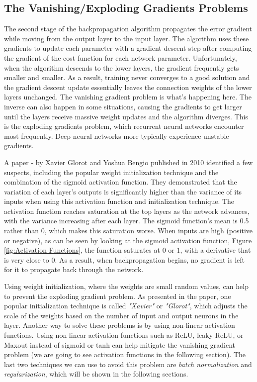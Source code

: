 \subsection{The Vanishing/Exploding Gradients Problems}
The second stage of the backpropagation algorithm propagates the error gradient while moving from the output layer to the input layer. The algorithm uses these gradients to update each parameter with a gradient descent step after computing the gradient of the cost function for each network parameter. 
Unfortunately, when the algorithm descends to the lower layers, the gradient frequently gets smaller and smaller. As a result, training never converges to a good solution and the gradient descent update essentially leaves the connection weights of the lower layers unchanged. The vanishing gradient problem is what's happening here.
The inverse can also happen in some situations, causing the gradients to get larger until the layers receive massive weight updates and the algorithm diverges. This is the exploding gradients problem, which recurrent neural networks encounter most frequently. Deep neural networks more typically experience unstable gradients.

A paper - by Xavier Glorot and Yoshua Bengio published in 2010 identified a few suspects, including the popular weight initialization technique and the combination of the sigmoid activation function. They demonstrated that the variation of each layer's outputs is significantly higher than the variance of its inputs when using this activation function and initialization technique. The activation function reaches saturation at the top layers as the network advances, with the variance increasing after each layer. The sigmoid function's mean is 0.5 rather than 0, which makes this saturation worse.
When inputs are high (positive or negative), as can be seen by looking at the sigmoid activation function, Figure \ref{fig:Activation Functions}, the function saturates at $0$ or $1$, with a derivative that is very close to $0$. As a result, when backpropagation begins, no gradient is left for it to propagate back through the network. 

Using weight initialization, where the weights are small random values, can help to prevent the exploding gradient problem. As presented in the paper, one popular initialization technique is called \textit{"Xavier"} or \textit{"Glorot"}, which adjusts the scale of the weights based on the number of input and output neurons in the layer. Another way to solve these problems is by using non-linear activation functions. Using non-linear activation functions such as ReLU, leaky ReLU, or Maxout instead of sigmoid or tanh can help mitigate the vanishing gradient problem (we are going to see activation functions in the following section).
The last two techniques we can use to avoid this problem are \textit{batch normalization} and \textit{regularization}, which will be shown in the following sections.